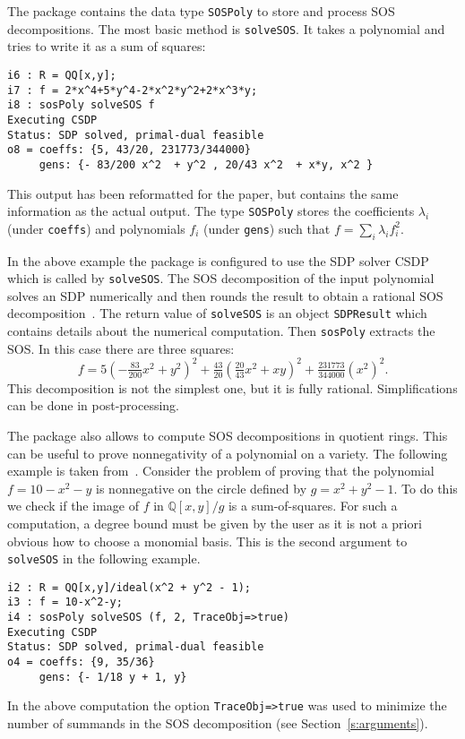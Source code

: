 \documentclass[11pt]{amsart}
\theoremstyle{plain}%
\theoremstyle{definition}
\theoremstyle{remark}
\newcommand{\QQ}{\mathbb{Q}}
\begin{document}
The package contains the data type \verb|SOSPoly| to store and process SOS decompositions.
The most basic method is \verb|solveSOS|.
It takes a polynomial and tries to write it as a sum of squares:
{\small
\begin{verbatim}
i6 : R = QQ[x,y];
i7 : f = 2*x^4+5*y^4-2*x^2*y^2+2*x^3*y;
i8 : sosPoly solveSOS f
Executing CSDP
Status: SDP solved, primal-dual feasible
o8 = coeffs: {5, 43/20, 231773/344000}              
     gens: {- 83/200 x^2  + y^2 , 20/43 x^2  + x*y, x^2 }
\end{verbatim}
}
\noindent
This output has been reformatted for the paper, but contains the same information as the actual output.
The type \verb|SOSPoly| stores the coefficients $\lambda_{i}$ (under \verb|coeffs|) and polynomials $f_{i}$ (under \verb|gens|) such that $f = \sum_{i}\lambda_{i}f_{i}^{2}$.

In the above example the package is configured to use the SDP solver CSDP which is called by \verb|solveSOS|.
The SOS decomposition of the input polynomial solves an SDP numerically and then rounds the result to obtain a rational SOS decomposition~\cite{peyrl2008computing}.
The return value of \verb|solveSOS| is an object \verb|SDPResult| which contains details about the numerical computation.
Then \verb|sosPoly| extracts the SOS.
In this case there are three squares:
\[
  f = 5(-\tfrac{83}{200} x^{2}+y^{2})^{2} + \tfrac{43}{20}
  (\tfrac{20}{43}x^{2} + xy)^{2} + \tfrac{231773}{344000} (x^{2})^{2}.
\]
This decomposition is not the simplest one, but it is fully rational. 
Simplifications can be done in post-processing.

The package also allows to compute SOS decompositions in quotient rings.
This can be useful to prove nonnegativity of a polynomial on a variety.  
The following example is taken from~\cite{parrilo2005exploiting}.  
Consider the problem of proving that the polynomial $f = 10{-}x^2{-}y$ is nonnegative on the circle defined by $g = x^2 {+} y^2 {-} 1$.
To do this we check if the image of $f$ in $\QQ[x,y]/g$ is a sum-of-squares.
For such a computation, a degree bound must be given by the user as it is not a priori obvious how to choose a monomial basis.
This is the second argument to \verb|solveSOS| in the following example.
{\small
\begin{verbatim}
i2 : R = QQ[x,y]/ideal(x^2 + y^2 - 1);
i3 : f = 10-x^2-y;
i4 : sosPoly solveSOS (f, 2, TraceObj=>true)
Executing CSDP
Status: SDP solved, primal-dual feasible
o4 = coeffs: {9, 35/36}      
     gens: {- 1/18 y + 1, y} 
\end{verbatim}
}
\noindent
In the above computation the option \verb|TraceObj=>true| was used to minimize the number of summands in the SOS decomposition (see Section~\ref{s:arguments}).
\end{document}
